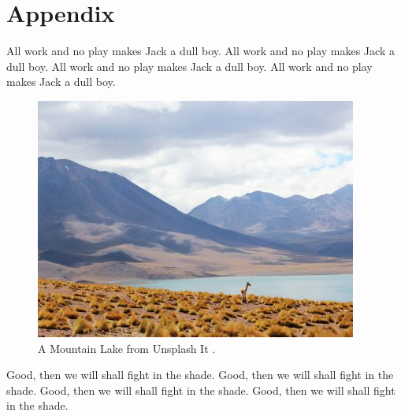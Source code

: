 
%
%

%
%

\section*{Appendix}
\label{sec:appendix}

All work and no play makes Jack a dull boy.
All work and no play makes Jack a dull boy.
All work and no play makes Jack a dull boy.
All work and no play makes Jack a dull boy.

\begin{figure}[ht]
\centering
\includegraphics[width=\linewidth,natwidth=400,natheight=300]{../figures/lake.jpg}
\caption{A Mountain Lake from Unsplash It \cite{unsplash}.}
\label{fig:lake}
\end{figure}

Good, then we will shall fight in the shade.
Good, then we will shall fight in the shade.
Good, then we will shall fight in the shade.
Good, then we will shall fight in the shade.
